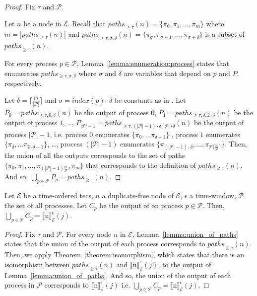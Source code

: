 \begin{proof}
  Fix $\tau$ and $\mathcal{P}$.

  Let $n$ be a node in $\mathcal{E}$. Recall that ${paths}_{\ge \tau}(n) = \{ \pi_{0}, \pi_{1}, \ldots, \pi_{m} \}$ where $m = |paths_{\ge \tau}(n)|$ and ${paths}_{\ge \tau, \sigma, \delta}(n) = \{ \pi_{\sigma}, \pi_{\sigma+1}, \ldots, \pi_{\sigma+\delta}\}$ is a subset of ${paths}_{\ge \tau}(n)$.


  For every process $p \in \mathcal{P}$, Lemma~\ref{lemma:enumeration:process} states that  enumerates $paths_{\ge \tau, \sigma, \delta}$ where $\sigma$ and $\delta$ are variables that depend on $p$ and $P$, respectively.

  Let $\delta = \lceil \frac{m}{|\mathcal{P}|} \rceil$ and $\sigma = index(p) \cdot \delta$ be constants as in .
  Let $P_{0} = paths_{\ge \tau, 0, \delta}(n)$ be the output of process $0$, $P_{1} = paths_{\ge \tau, \delta, 2\cdot\delta}(n)$ be the output of process $1$, \ldots, $P_{|\mathcal{P}| - 1} = paths_{\ge \tau, (|\mathcal{P}| - 1) \cdot \delta, |\mathcal{P}| \cdot \delta}(n)$ be the output of process $|\mathcal{P}| - 1$, i.e. process $0$ enumerates $\{ \pi_{0}, \ldots \pi_{\delta-1} \}$ , process $1$ enumerates $\{\pi_{\delta}, \ldots \pi_{2 \cdot \delta-1}\}$, \ldots, process $(|\mathcal{P}| - 1)$ enumerates $\{\pi_{(|\mathcal{P}| - 1) \cdot \delta}, \ldots, \pi_{\mathcal{P} \lceil \frac{m}{\mathcal{P}} \rceil}\}$.
  Then, the union of all the outputs corresponds to the set of paths $\{ \pi_{0}, \pi_{1}, \ldots, \pi_{(|\mathcal{P}| - 1)\frac{m}{\mathcal{P}}}, \pi_{m} \}$ that corresponds to the definition of $paths_{\ge \tau}(n)$.
  And so, $\bigcup\limits_{p \in \mathcal{P}} P_{p} = paths_{\ge \tau}(n)$.
\end{proof}

\begin{theorem*}[\ref{theorem:enumeration}]
  Let $\mathcal{E}$ be a time-ordered \acrshort{tecs}, $n$ a duplicate-free node of $\mathcal{E}$, $\epsilon$ a time-window, $\mathcal{P}$ the set of all processes. Let $C_{p}$ be the output of  on process $p \in \mathcal{P}$. Then, $\bigcup\limits_{p \in \mathcal{P}} C_{p} = {\llbracket \text{n} \rrbracket}^{\epsilon}_{\mathcal{E}}(j)$.
\end{theorem*}

\begin{proof}
  Fix $\tau$ and $\mathcal{P}$. For every node $n$ in $\mathcal{E}$, Lemma~\ref{lemma:union_of_paths} states that the union of the output of each process corresponds to ${paths}_{\ge \tau}(n)$. Then, we apply Theorem~\ref{theorem:isomorphism}, which states that there is an isomorphism between ${paths}_{\ge \tau}(n)$ and ${\llbracket \text{n} \rrbracket}^{\epsilon}_{\mathcal{E}}(j)$, to the output of Lemma~\ref{lemma:union_of_paths}. And so, the union of the output of each process in $\mathcal{P}$ corresponds to ${\llbracket \text{n} \rrbracket}^{\epsilon}_{\mathcal{E}}(j)$ i.e. $\bigcup\limits_{p \in \mathcal{P}} C_{p} = {\llbracket \text{n} \rrbracket}^{\epsilon}_{\mathcal{E}}(j)$.
\end{proof}

